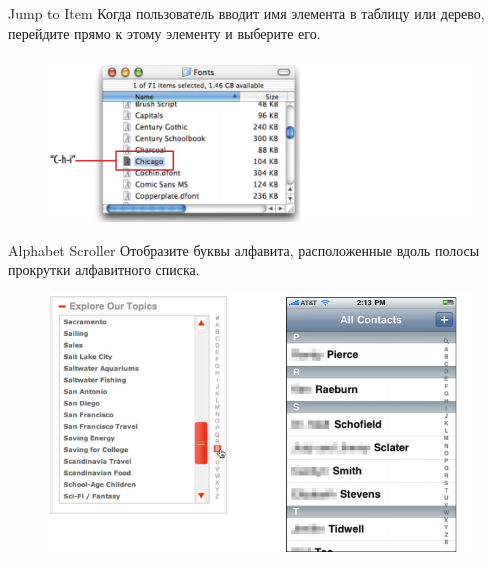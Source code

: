 \documentclass{beamer}
\begin{document}
\begin{frame}[t]{Jump to Item}
	Когда пользователь вводит имя элемента в таблицу или дерево, перейдите прямо к этому элементу и выберите его.
	\begin{figure}[h]
		\centering
		\includegraphics[scale=0.75]{images/lec07-pic63.png}
	\end{figure}
\end{frame}	

\begin{frame}[t]{Alphabet Scroller}
	Отобразите буквы алфавита, расположенные вдоль полосы прокрутки алфавитного списка.
	\begin{figure}[h]
		\centering
		\includegraphics[scale=0.5]{images/lec07-pic64.png}
	\end{figure}
\end{frame}	
\end{document}
